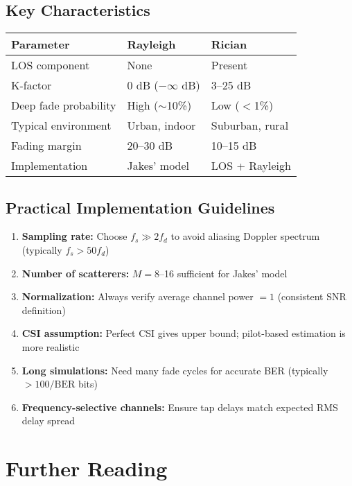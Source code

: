 \subsection*{Key Characteristics}

\begin{center}
\begin{tabular}{@{}lll@{}}
\toprule
\textbf{Parameter} & \textbf{Rayleigh} & \textbf{Rician} \\
\midrule
LOS component & None & Present \\
K-factor & 0 dB ($-\infty$ dB) & 3--25 dB \\
Deep fade probability & High ($\sim$10\%) & Low ($<$1\%) \\
Typical environment & Urban, indoor & Suburban, rural \\
Fading margin & 20--30 dB & 10--15 dB \\
Implementation & Jakes' model & LOS + Rayleigh \\
\bottomrule
\end{tabular}
\end{center}

\subsection*{Practical Implementation Guidelines}

\begin{enumerate}
\item \textbf{Sampling rate:} Choose $f_s \gg 2f_d$ to avoid aliasing Doppler spectrum (typically $f_s > 50 f_d$)
\item \textbf{Number of scatterers:} $M = 8$--16 sufficient for Jakes' model
\item \textbf{Normalization:} Always verify average channel power $= 1$ (consistent SNR definition)
\item \textbf{CSI assumption:} Perfect CSI gives upper bound; pilot-based estimation is more realistic
\item \textbf{Long simulations:} Need many fade cycles for accurate BER (typically $> 100/\mathrm{BER}$ bits)
\item \textbf{Frequency-selective channels:} Ensure tap delays match expected RMS delay spread
\end{enumerate}

\section{Further Reading}

